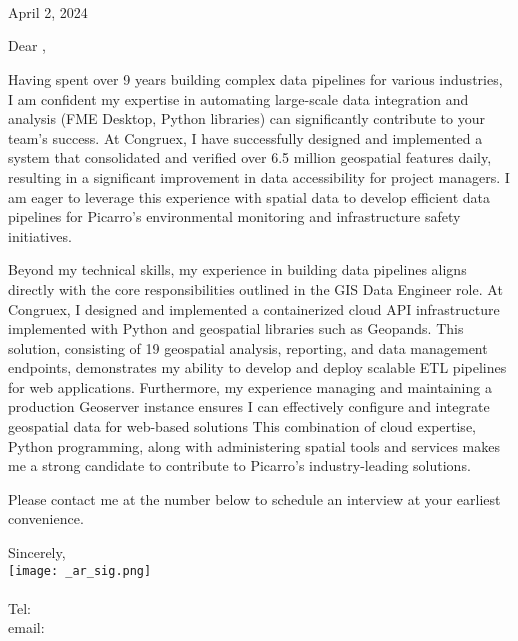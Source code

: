 \documentclass[letterpaper]{article}
\begin{document}
\large
\JobManager \\
\JobManagerTitle \\
\textbf{\JobCompany} \\

\null\hfill April 2, 2024

Dear \JobManagerShort,

Having spent over 9 years building complex data pipelines for various
industries, I am confident my expertise in automating large-scale data
integration and analysis (FME Desktop, Python libraries) can significantly
contribute to your team's success.  At Congruex, I have
successfully designed and implemented a system that consolidated and verified
over 6.5 million geospatial features daily, resulting in a significant improvement
in data accessibility for project managers.  
I am eager to leverage this experience with spatial data to develop
efficient data pipelines for Picarro's environmental
monitoring and infrastructure safety initiatives.


Beyond my technical skills, my experience in building data pipelines aligns
directly with the core responsibilities outlined in the GIS Data Engineer role.
At Congruex, I designed and implemented a containerized cloud API
infrastructure implemented with Python and geospatial libraries such as Geopands.
This solution,
consisting of 19 geospatial analysis, reporting, and data management endpoints,
demonstrates my ability to develop and deploy scalable ETL pipelines for web
applications.  Furthermore, my experience managing and maintaining a production
Geoserver instance ensures I can effectively configure and integrate geospatial
data for web-based solutions
This combination of cloud expertise, Python programming, along with 
administering spatial tools and services makes me a strong candidate to contribute to
Picarro's industry-leading solutions.

Please contact me at the number below to schedule an interview at your earliest convenience.

Sincerely,\\
    \hspace{1em}
    \texttt{[image: \_ar\_sig.png]} \\
    \CVsigname \\
    \small
    Tel: \CVphone \\
    email: \CVemail
\end{document}
